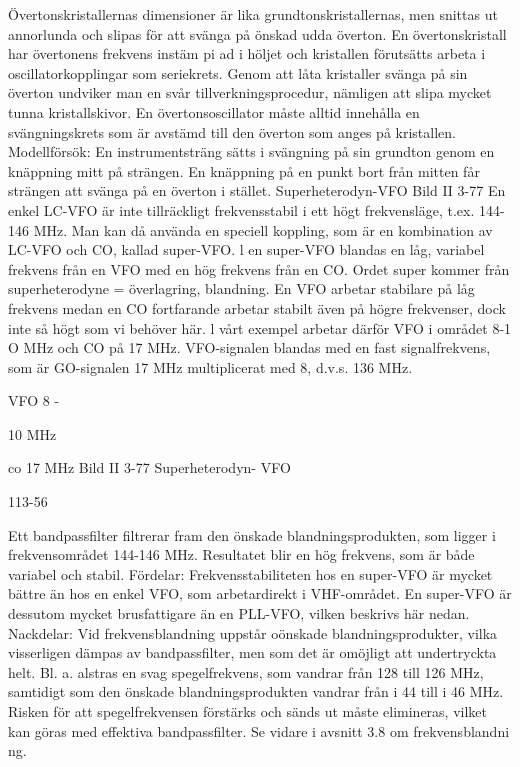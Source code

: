 {{{{Övertonskristallernas dimensioner är lika
grundtonskristallernas, men snittas ut annorlunda och slipas för att svänga på önskad
udda överton. En övertonskristall har övertonens frekvens instäm pi ad i höljet och kristallen förutsätts arbeta i oscillatorkopplingar
som seriekrets. Genom att låta kristaller
svänga på sin överton undviker man en svår
tillverkningsprocedur, nämligen att slipa
mycket tunna kristallskivor.
En övertonsoscillator måste alltid innehålla en svängningskrets som är avstämd till
den överton som anges på kristallen.
Modellförsök: En instrumentsträng sätts i
svängning på sin grundton genom en knäppning mitt på strängen. En knäppning på en
punkt bort från mitten får strängen att svänga
på en överton i stället.
Superheterodyn-VFO
Bild II 3-77
En enkel LC-VFO är inte tillräckligt frekvensstabil i ett högt frekvensläge, t.ex. 144-146
MHz. Man kan då använda en speciell koppling, som är en kombination av LC-VFO och
CO, kallad super-VFO.
l en super-VFO blandas en låg, variabel
frekvens från en VFO med en hög frekvens
från en CO. Ordet super kommer från
superheterodyne = överlagring, blandning.
En VFO arbetar stabilare på låg frekvens
medan en CO fortfarande arbetar stabilt
även på högre frekvenser, dock inte så högt
som vi behöver här. l vårt exempel arbetar
därför VFO i området 8-1 O MHz och CO på
17 MHz. VFO-signalen blandas med en fast
signalfrekvens, som är GO-signalen 17 MHz
multiplicerat med 8, d.v.s. 136 MHz.

VFO 8 -

10 MHz

co 17 MHz
Bild II 3-77 Superheterodyn- VFO

113-56

Ett bandpassfilter filtrerar fram den önskade blandningsprodukten, som ligger i
frekvensområdet 144-146 MHz. Resultatet
blir en hög frekvens, som är både variabel
och stabil.
Fördelar:
Frekvensstabiliteten hos en super-VFO
är mycket bättre än hos en enkel VFO, som
arbetardirekt i VHF-området. En super-VFO
är dessutom mycket brusfattigare än en
PLL-VFO, vilken beskrivs här nedan.
Nackdelar:
Vid frekvensblandning uppstår oönskade blandningsprodukter, vilka visserligen
dämpas av bandpassfilter, men som det är
omöjligt att undertryckta helt. Bl. a. alstras en
svag spegelfrekvens, som vandrar från 128
till 126 MHz, samtidigt som den önskade
blandningsprodukten vandrar från i 44 till
i 46 MHz. Risken för att spegelfrekvensen
förstärks och sänds ut måste elimineras,
vilket kan göras med effektiva bandpassfilter. Se vidare i avsnitt 3.8 om frekvensblandni ng.

}}}}
